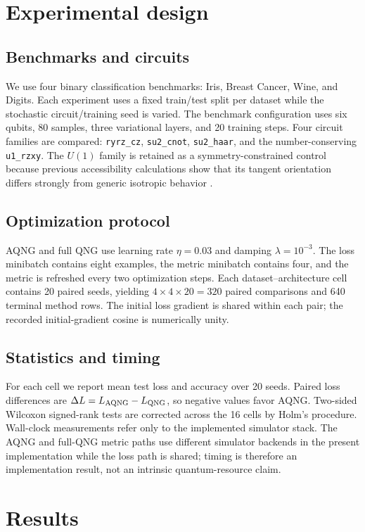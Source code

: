 \section{Experimental design}
\subsection{Benchmarks and circuits}
We use four binary classification benchmarks: Iris, Breast Cancer, Wine, and Digits. Each experiment uses a fixed train/test split per dataset while the stochastic circuit/training seed is varied. The benchmark configuration uses six qubits, 80 samples, three variational layers, and 20 training steps. Four circuit families are compared: \texttt{ryrz\_cz}, \texttt{su2\_cnot}, \texttt{su2\_haar}, and the number-conserving \texttt{u1\_rzxy}. The $U(1)$ family is retained as a symmetry-constrained control because previous accessibility calculations show that its tangent orientation differs strongly from generic isotropic behavior \cite{AitHaddouRank,AitHaddouSpectral}.

\subsection{Optimization protocol}
AQNG and full QNG use learning rate $\eta=0.03$ and damping $\lambda=10^{-3}$. The loss minibatch contains eight examples, the metric minibatch contains four, and the metric is refreshed every two optimization steps. Each dataset--architecture cell contains 20 paired seeds, yielding $4\times4\times20=320$ paired comparisons and 640 terminal method rows. The initial loss gradient is shared within each pair; the recorded initial-gradient cosine is numerically unity.

\subsection{Statistics and timing}
For each cell we report mean test loss and accuracy over 20 seeds. Paired loss differences are $\Delta L=L_{\rm AQNG}-L_{\rm QNG}$, so negative values favor AQNG. Two-sided Wilcoxon signed-rank tests are corrected across the 16 cells by Holm's procedure. Wall-clock measurements refer only to the implemented simulator stack. The AQNG and full-QNG metric paths use different simulator backends in the present implementation while the loss path is shared; timing is therefore an implementation result, not an intrinsic quantum-resource claim.

\section{Results}
